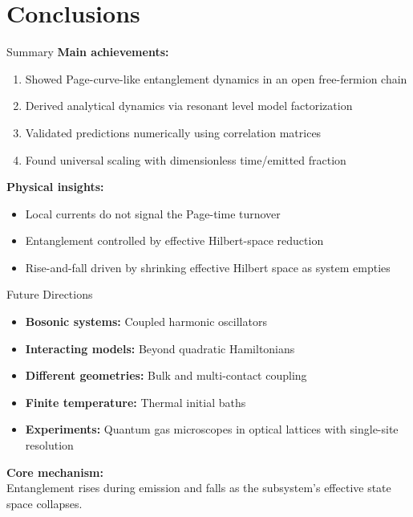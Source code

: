 \documentclass[aspectratio=169,11pt]{beamer}
\begin{document}
\section{Conclusions}

\begin{frame}{Summary}
\small
    \textbf{Main achievements:}
    \begin{enumerate}\setlength{\itemsep}{0pt}
        \item Showed \alert{Page-curve-like} entanglement dynamics in an open free-fermion chain
        \item Derived analytical dynamics via resonant level model factorization
        \item Validated predictions numerically using correlation matrices
        \item Found universal scaling with dimensionless time/emitted fraction
    \end{enumerate}
    
    \textbf{Physical insights:}
    \begin{itemize}\setlength{\itemsep}{0pt}
        \item Local currents do not signal the Page-time turnover
        \item Entanglement controlled by effective Hilbert-space reduction
        \item Rise-and-fall driven by shrinking effective Hilbert space as system empties
    \end{itemize}
\end{frame}

\begin{frame}{Future Directions}
    \begin{itemize}
        \item \textbf{Bosonic systems:} Coupled harmonic oscillators
        \item \textbf{Interacting models:} Beyond quadratic Hamiltonians
        \item \textbf{Different geometries:} Bulk and multi-contact coupling
        \item \textbf{Finite temperature:} Thermal initial baths
        \item \textbf{Experiments:} Quantum gas microscopes in optical lattices with single-site resolution
    \end{itemize}
    
    \vspace{0.5cm}
    
    \begin{center}
        \textbf{Core mechanism:}\\
        Entanglement rises during emission and falls as the subsystem's effective state space collapses.
    \end{center}
\end{frame}
\end{document}
